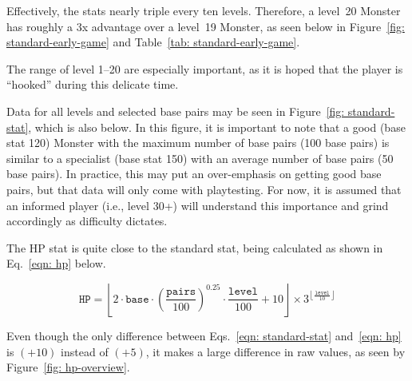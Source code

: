 Effectively, the stats nearly triple every ten levels. Therefore, a level~20 Monster has roughly a 3x advantage over a level~19 Monster, as seen below in Figure~\ref{fig: standard-early-game} and Table~\ref{tab: standard-early-game}. 

The range of level 1--20 are especially important, as it is hoped that the player is ``hooked'' during this delicate time.

Data for all levels and selected base pairs may be seen in Figure~\ref{fig: standard-stat}, which is also below. In this figure, it is important to note that a good (base stat 120) Monster with the maximum number of base pairs (100 base pairs) is similar to a specialist (base stat 150) with an average number of base pairs (50 base pairs). In practice, this may put an over-emphasis on getting good base pairs, but that data will only come with playtesting. For now, it is assumed that an informed player (i.e., level 30+) will understand this importance and grind accordingly as difficulty dictates.

			

		




\newpage
{}

The HP stat is quite close to the standard stat, being calculated as shown in Eq.~\eqref{eqn: hp} below.

\begin{equation}\label{eqn: hp}
	\texttt{HP} = \left\lfloor 2\cdot\texttt{base}\cdot\left(\frac{\texttt{pairs}}{100}\right)^{0.25}\cdot\frac{\texttt{level}}{100} + 10 \right\rfloor \times 3^{\left\lfloor\frac{\texttt{level}}{10}\right\rfloor}
\end{equation}

\noindent Even though the only difference between Eqs.~\eqref{eqn: standard-stat} and~\eqref{eqn: hp} is $(+10)$ instead of $(+5)$, it makes a large difference in raw values, as seen by Figure~\ref{fig: hp-overview}.

